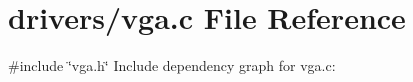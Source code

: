 \hypertarget{a00002}{}\section{drivers/vga.c File Reference}
\label{a00002}
{\ttfamily \#include \char`\"{}vga.\+h\char`\"{}}\newline
Include dependency graph for vga.\+c\+:
